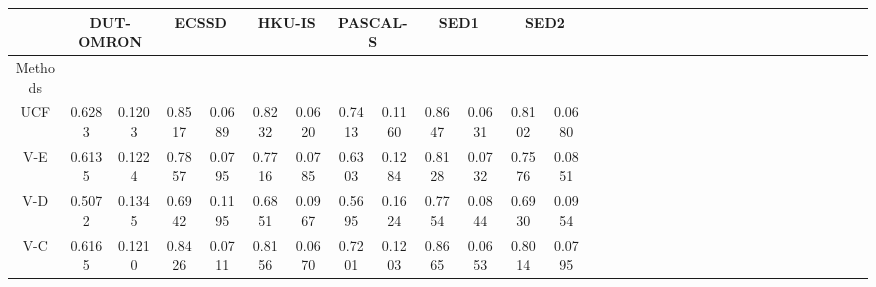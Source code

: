 \documentclass[10pt,twocolumn,letterpaper]{article}
\begin{document}
\begin{table*}
\vspace{-4mm}
\begin{center}
\doublerulesep=0.6pt
\begin{tabular}{|c|c|c|c|c|c|c|c|c|c|c|c|c|c|c||c|c|c|c|c|c|c|c|c|c|c|c|c|c|c|c|c|c|c|c|c|c|c|c|c|||c|c|c|c|c|c|c|c|||}
\hline
\multicolumn{4}{|c|}{}
&\multicolumn{4}{|c|}{DUT-OMRON}
&\multicolumn{4}{|c|}{ECSSD}
&\multicolumn{4}{|c|}{HKU-IS}
&\multicolumn{4}{|c|}{PASCAL-S}
&\multicolumn{4}{|c|}{SED1}
&\multicolumn{4}{|c|}{SED2}
\\
\hline
\multicolumn{4}{|c|}{Methods}
&\multicolumn{2}{|c|}{}&\multicolumn{2}{|c|}{}&\multicolumn{2}{|c|}{}&\multicolumn{2}{|c|}{}&\multicolumn{2}{|c|}{}&\multicolumn{2}{|c|}{}&\multicolumn{2}{|c|}{}&\multicolumn{2}{|c|}{}&\multicolumn{2}{|c|}{}&\multicolumn{2}{|c|}{}&\multicolumn{2}{|c|}{}&\multicolumn{2}{|c|}{}\\
\hline
\multicolumn{4}{|c|}{UCF}
&\multicolumn{2}{|c|}{\textcolor[rgb]{0,0,1}{0.6283}}&\multicolumn{2}{|c|}{0.1203}&\multicolumn{2}{|c|}{\textcolor[rgb]{1,0,0}{0.8517}}&\multicolumn{2}{|c|}{\textcolor[rgb]{1,0,0}{0.0689}}&\multicolumn{2}{|c|}{\textcolor[rgb]{0,0,1}{0.8232}}&\multicolumn{2}{|c|}{\textcolor[rgb]{1,0,0}{0.0620}}&\multicolumn{2}{|c|}{\textcolor[rgb]{0,1,0}{0.7413}}&\multicolumn{2}{|c|}{\textcolor[rgb]{1,0,0}{0.1160}}&\multicolumn{2}{|c|}{\textcolor[rgb]{1,0,0}{0.8647}}&\multicolumn{2}{|c|}{\textcolor[rgb]{1,0,0}{0.0631}}&\multicolumn{2}{|c|}{\textcolor[rgb]{1,0,0}{0.8102}}&\multicolumn{2}{|c|}{\textcolor[rgb]{1,0,0}{0.0680}}\\
\multicolumn{4}{|c|}{V-E}
&\multicolumn{2}{|c|}{0.6135}&\multicolumn{2}{|c|}{0.1224}&\multicolumn{2}{|c|}{0.7857}&\multicolumn{2}{|c|}{0.0795}&\multicolumn{2}{|c|}{0.7716}&\multicolumn{2}{|c|}{0.0785}&\multicolumn{2}{|c|}{0.6303}&\multicolumn{2}{|c|}{0.1284}&\multicolumn{2}{|c|}{0.8128}&\multicolumn{2}{|c|}{0.0732}&\multicolumn{2}{|c|}{0.7576}&\multicolumn{2}{|c|}{0.0851}\\
\multicolumn{4}{|c|}{V-D}
&\multicolumn{2}{|c|}{0.5072}&\multicolumn{2}{|c|}{0.1345}&\multicolumn{2}{|c|}{0.6942}&\multicolumn{2}{|c|}{0.1195}&\multicolumn{2}{|c|}{0.6851}&\multicolumn{2}{|c|}{0.0967}&\multicolumn{2}{|c|}{0.5695}&\multicolumn{2}{|c|}{0.1624}&\multicolumn{2}{|c|}{0.7754}&\multicolumn{2}{|c|}{0.0844}&\multicolumn{2}{|c|}{0.6930}&\multicolumn{2}{|c|}{0.0954}\\
\multicolumn{4}{|c|}{V-C}
&\multicolumn{2}{|c|}{0.6165}&\multicolumn{2}{|c|}{0.1210}&\multicolumn{2}{|c|}{\textcolor[rgb]{0,1,0}{0.8426}}&\multicolumn{2}{|c|}{\textcolor[rgb]{0,1,0}{0.0711}}&\multicolumn{2}{|c|}{0.8156}&\multicolumn{2}{|c|}{\textcolor[rgb]{0,0,1}{0.0670}}&\multicolumn{2}{|c|}{\textcolor[rgb]{0,0,1}{0.7201}}&\multicolumn{2}{|c|}{\textcolor[rgb]{0,1,0}{0.1203}}&\multicolumn{2}{|c|}{\textcolor[rgb]{0,1,0}{0.8665}}&\multicolumn{2}{|c|}{\textcolor[rgb]{0,1,0}{0.0653}}&\multicolumn{2}{|c|}{\textcolor[rgb]{0,1,0}{0.8014}}&\multicolumn{2}{|c|}{\textcolor[rgb]{0,0,1}{0.0795}}\\

\end{tabular}
\end{center}
\end{table*}
\end{document}
